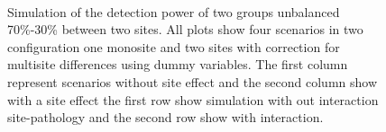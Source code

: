 \documentclass[authoryear]{elsarticle}
\begin{document}
\begin{figure}[tbp]
     \\
     \caption{
     Simulation of the detection power of two groups unbalanced 70\%-30\% between two sites. All plots show four scenarios in two configuration one monosite and two sites with correction for multisite differences using dummy variables. The first column represent scenarios without site effect and the second column show with a site effect the first row show simulation with out interaction site-pathology and the second row show with interaction.
}
     \label{fig_full_sim_debalancing}
 \end{figure}
 
\end{document}
